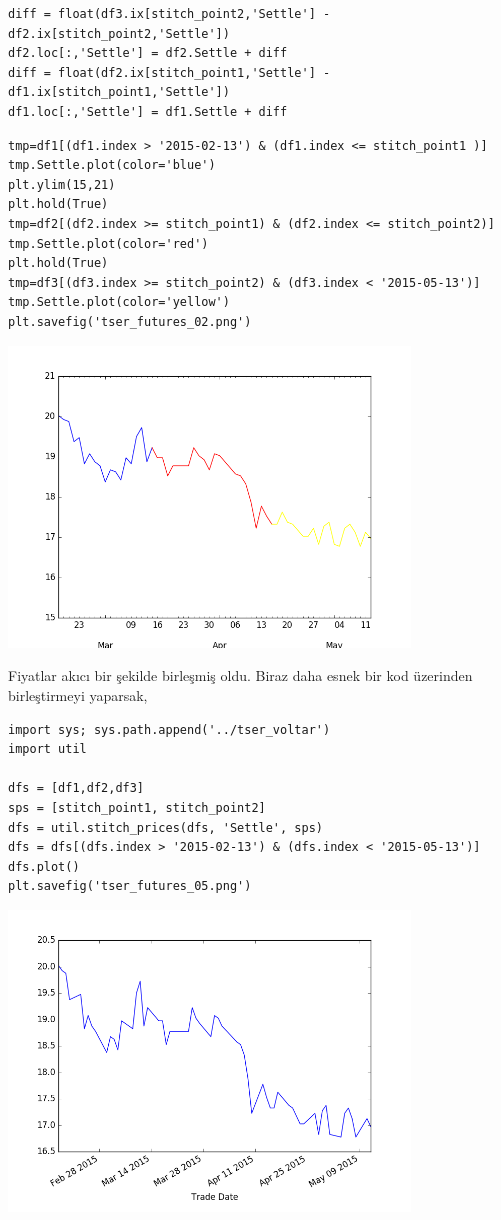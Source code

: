 \documentclass[12pt,fleqn]{article}\usepackage{../../common}
\begin{document}
\begin{verbatim}
diff = float(df3.ix[stitch_point2,'Settle'] - df2.ix[stitch_point2,'Settle'])
df2.loc[:,'Settle'] = df2.Settle + diff
diff = float(df2.ix[stitch_point1,'Settle'] - df1.ix[stitch_point1,'Settle'])
df1.loc[:,'Settle'] = df1.Settle + diff
\end{verbatim}

\begin{verbatim}
tmp=df1[(df1.index > '2015-02-13') & (df1.index <= stitch_point1 )]
tmp.Settle.plot(color='blue')
plt.ylim(15,21)
plt.hold(True)
tmp=df2[(df2.index >= stitch_point1) & (df2.index <= stitch_point2)]
tmp.Settle.plot(color='red')
plt.hold(True)
tmp=df3[(df3.index >= stitch_point2) & (df3.index < '2015-05-13')]
tmp.Settle.plot(color='yellow')
plt.savefig('tser_futures_02.png')
\end{verbatim}

\includegraphics[height=8cm]{tser_futures_02.png}

Fiyatlar akıcı bir şekilde birleşmiş oldu. Biraz daha esnek bir kod üzerinden
birleştirmeyi yaparsak,

\begin{verbatim}
import sys; sys.path.append('../tser_voltar')
import util

dfs = [df1,df2,df3]
sps = [stitch_point1, stitch_point2]
dfs = util.stitch_prices(dfs, 'Settle', sps)
dfs = dfs[(dfs.index > '2015-02-13') & (dfs.index < '2015-05-13')]
dfs.plot()
plt.savefig('tser_futures_05.png')
\end{verbatim}

\includegraphics[height=8cm]{tser_futures_05.png}
\end{document}
